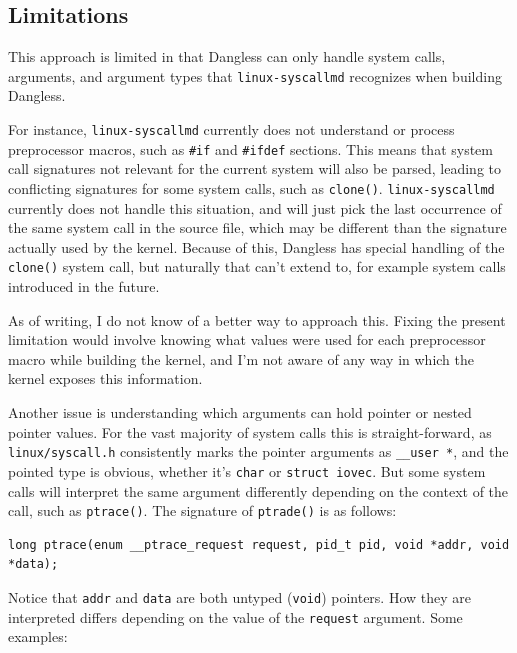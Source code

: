 
\subsection{Limitations}

This approach is limited in that Dangless can only handle system calls, arguments, and argument types that \texttt{linux-syscallmd} recognizes when building Dangless.

For instance, \texttt{linux-syscallmd} currently does not understand or process preprocessor macros, such as \lstinline!#if! and \lstinline!#ifdef! sections. This means that system call signatures not relevant for the current system will also be parsed, leading to conflicting signatures for some system calls, such as \lstinline!clone()!. \texttt{linux-syscallmd} currently does not handle this situation, and will just pick the last occurrence of the same system call in the source file, which may be different than the signature actually used by the kernel. Because of this, Dangless has special handling of the \lstinline!clone()! system call, but naturally that can't extend to, for example system calls introduced in the future.

As of writing, I do not know of a better way to approach this. Fixing the present limitation would involve knowing what values were used for each preprocessor macro while building the kernel, and I'm not aware of any way in which the kernel exposes this information.

Another issue is understanding which arguments can hold pointer or nested pointer values. For the vast majority of system calls this is straight-forward, as \texttt{linux/syscall.h} consistently marks the pointer arguments as \lstinline!__user *!, and the pointed type is obvious, whether it's \lstinline!char! or \lstinline!struct iovec!. But some system calls will interpret the same argument differently depending on the context of the call, such as \lstinline!ptrace()!. The signature of \lstinline!ptrade()! is as follows:

\begin{lstlisting}
long ptrace(enum __ptrace_request request, pid_t pid, void *addr, void *data);
\end{lstlisting}

Notice that \lstinline!addr! and \lstinline!data! are both untyped (\lstinline!void!) pointers. How they are interpreted differs depending on the value of the \lstinline!request! argument. Some examples:

